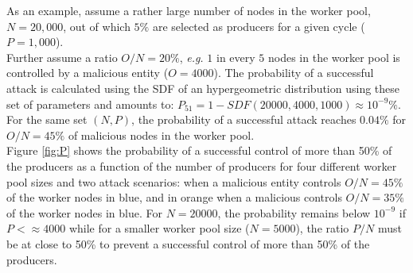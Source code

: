 As an example, assume a rather large number of nodes in the worker pool, $N = 20,000$, out of which $5\%$ are selected as producers for a given cycle ($P = 1,000$). \\

Further assume a ratio $O/N=20\%$, \textit{e.g.} $1$ in every $5$ nodes in the worker pool is controlled by a malicious entity ($O=4000$). The probability of a successful attack is calculated using the SDF of an hypergeometric distribution using these set of parameters and amounts to: $P_{51} = 1-SDF(20000,4000,1000) \approx 10^{-9}\%$. For the same set $(N,P)$, the probability of a successful attack reaches $0.04\%$ for $O/N=45\%$ of malicious nodes in the worker pool. \\

Figure \ref{fig:P} shows the probability of a successful control of more than 50\% of the producers as a function of the number of producers for four different worker pool sizes and two attack scenarios: when a malicious entity controls $O/N = 45\%$ of the worker nodes in blue, and in orange when a malicious controls $O/N = 35\%$ of the worker nodes in blue. For $N=20000$, the probability remains below $10^{-9}$ if $P < \approx 4000$ while for a smaller worker pool size ($N=5000$), the ratio $P/N$ must be at close to 50\% to prevent a successful control of more than 50\% of the producers. 

\newpage

